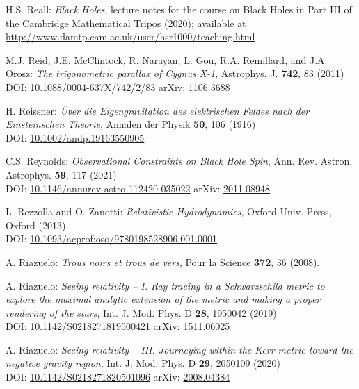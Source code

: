 \begin{thebibliography}{123}
H.S. Reall: {\em Black Holes}, lecture notes for the course on Black Holes in
Part III of the Cambridge Mathematical Tripos (2020); available at\\
\url{http://www.damtp.cam.ac.uk/user/hsr1000/teaching.html}

M.J. Reid, J.E. McClintock, R. Narayan, L. Gou, R.A. Remillard, and J.A. Orosz:
{\em The trigonometric parallax of Cygnus X-1},
Astrophys. J. {\bf 742}, 83 (2011)\\
DOI: \href{https://doi.org/10.1088/0004-637X/742/2/83}{10.1088/0004-637X/742/2/83}\hfill
arXiv: \href{https://arxiv.org/abs/1106.3688}{1106.3688}

H. Reissner:
{\em Über die Eigengravitation des elektrischen Feldes nach der Einsteinschen Theorie},
Annalen der Physik {\bf 50}, 106 (1916)\\
DOI: \href{https://doi.org/10.1002/andp.19163550905}{10.1002/andp.19163550905}

C.S. Reynolds:
{\em Observational Constraints on Black Hole Spin},
Ann. Rev. Astron. Astrophys. {\bf 59}, 117 (2021)\\
DOI:  \href{https://doi.org/10.1146/annurev-astro-112420-035022}{10.1146/annurev-astro-112420-035022}\hfill
arXiv: \href{https://arxiv.org/abs/2011.08948}{2011.08948}

L. Rezzolla and O. Zanotti:
{\em Relativistic Hydrodynamics},
Oxford Univ. Press, Oxford (2013)\\
DOI: \href{https://doi.org/10.1093/acprof:oso/9780198528906.001.0001}{10.1093/acprof:oso/9780198528906.001.0001}

A. Riazuelo:
{\em Trous noirs et trous de vers},
Pour la Science {\bf 372}, 36 (2008).

A. Riazuelo:
{\em Seeing relativity -- I. Ray tracing in a Schwarzschild metric to explore the maximal analytic extension of the metric and making a proper rendering of the stars},
Int. J. Mod. Phys. D {\bf 28}, 1950042 (2019)\\
DOI: \href{https://doi.org/10.1142/S0218271819500421}{10.1142/S0218271819500421}
\hfill
arXiv: \href{https://arxiv.org/abs/1511.06025}{1511.06025}

A. Riazuelo:
{\em Seeing relativity -- III. Journeying within the Kerr metric toward the negative gravity region},
Int. J. Mod. Phys. D {\bf 29}, 2050109 (2020)\\
DOI: \href{https://doi.org/10.1142/S0218271820501096}{10.1142/S0218271820501096}\hfill
arXiv: \href{https://arxiv.org/abs/2008.04384}{2008.04384}


\end{thebibliography}
